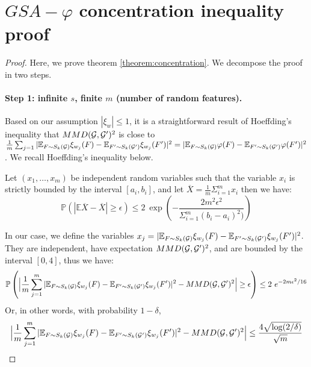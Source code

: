 \section{$GSA-\varphi$ concentration inequality proof}
\label{section:proof}

\begin{proof}
Here, we prove theorem \ref{theorem:concentration}. We decompose the proof in two steps.

\paragraph{Step 1: infinite $s$, finite $m$ (number of random features).} Based on our assumption $|\xi_w|\leq 1$, it is a straightforward result of Hoeffding's inequality that  $MMD(\mathcal{G}, \mathcal{G}')^2$ is close to $\frac{1}{m} \sum_{j=1} | \mathbb{E}_{F \sim S_k(\mathcal{G})} \xi_{w_j}(F) - \mathbb{E}_{F' \sim S_k(\mathcal{G}')} \xi_{w_j}(F') |^2 = | \mathbb{E}_{F \sim S_k(\mathcal{G})} \varphi(F) - \mathbb{E}_{F' \sim S_k(\mathcal{G}')} \varphi(F') |^2$. We recall Hoeffding's inequality below.
\begin{lemma} 
Let $(x_1,\ldots, x_m)$ be independent random variables such that the variable $x_i$ is strictly bounded by the interval $[a_i , b_i]$, and let $\overline{X}=\frac{1}{m}\Sigma_{i=1}^{m}x_i$ then we have:
\begin{equation}
\label{eq:Hoeffding}
    \mathbb{P}(|\mathbb{E}\overline{X}-\overline{X}|\geq \epsilon)\leq 2~ \exp \left(-\frac{2m^2\epsilon^2}{\Sigma_{i=1}^m(b_i-a_i)^2)} \right)
\end{equation}
\end{lemma}
In our case, we define the variables $x_j=| \mathbb{E}_{F \sim S_k(\mathcal{G})} \xi_{w_j}(F) - \mathbb{E}_{F' \sim S_k(\mathcal{G}')} \xi_{w_j}(F') |^2$. They are independent, have expectation $MMD(\mathcal{G},\mathcal{G}')^2$, and are bounded by the interval $[0,4]$, thus we have:
\begin{equation*}
    \mathbb{P}\left(\Big|\frac{1}{m} \sum_{j=1}^m | \mathbb{E}_{F \sim S_k(\mathcal{G})} \xi_{w_j}(F) - \mathbb{E}_{F' \sim S_k(\mathcal{G}')} \xi_{w_j}(F') |^2 - MMD(\mathcal{G},\mathcal{G}')^2 \Big| \geq \epsilon\right) \leq 2~ e^{ -2m\epsilon^2/16}
\end{equation*}
Or, in other words, with probability $1-\delta$,
\begin{equation}\label{eq:step1}
\Big|\frac{1}{m} \sum_{j=1}^m | \mathbb{E}_{F \sim S_k(\mathcal{G})} \xi_{w_j}(F) - \mathbb{E}_{F' \sim S_k(\mathcal{G}')} \xi_{w_j}(F') |^2 - MMD(\mathcal{G},\mathcal{G}')^2 \Big| \leq \frac{4 \sqrt{\log (2/\delta)}}{\sqrt{m}}
\end{equation}


\end{proof}
